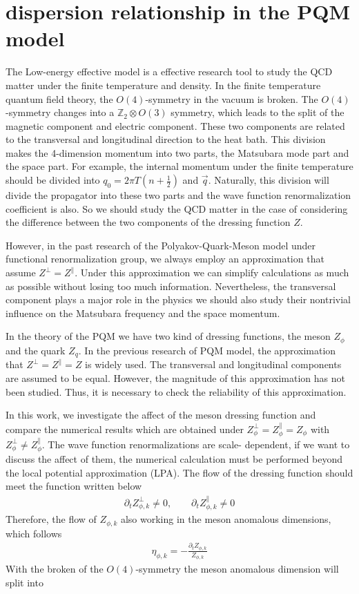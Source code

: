 \documentclass[%
reprint,
superscriptaddress,
showpacs,preprintnumbers,
 amsmath,amssymb,
 aps,
prd,
]{revtex4-1}
\begin{document}
\section{dispersion relationship in the PQM model}
The Low-energy effective model is a effective research tool to study the QCD matter under the finite temperature and density. In the 
finite temperature quantum field theory, the $O(4)$-symmetry in the vacuum is broken. The $O(4)$-symmetry changes into a 
$\mathbb{Z}_2\otimes O(3)$ symmetry, which leads to the split of the magnetic component and electric component. These two 
components are related to the transversal and longitudinal direction to the heat bath. This division makes the 4-dimension momentum
into two parts, the Matsubara mode part and the space part. For example, the internal momentum under the finite temperature should 
be divided into $q_0=2\pi T(n+\frac{1}{2})$ and $\vec{q}$. Naturally, this division will divide the propagator into these two parts and 
the wave function renormalization coefficient is also. So we should study the QCD matter in the case of considering the difference 
between the two components of the dressing function $Z$. \par

However, in the past research of the Polyakov-Quark-Meson model under functional renormalization group, we always employ an 
approximation that assume $Z^{\bot}=Z^{\|}$. Under this approximation we can simplify calculations as much as possible without 
losing too much information. Nevertheless, the transversal component plays a major role in the physics we should also study their 
nontrivial influence on the Matsubara frequency and the space momentum.\par

In the theory of the PQM we have two kind of dressing functions, the meson $Z_{\phi}$ and the quark $Z_{q}$. In the previous 
research of PQM model, the approximation that $Z^{\bot}=Z^{\|}=Z$ is widely used. The transversal and longitudinal components are
assumed to be equal. However, the magnitude of this approximation has not been studied. Thus, it is necessary to check the 
reliability of this approximation.\par

In this work, we investigate the affect of the meson dressing function and compare the numerical results which are obtained under 
$Z^{\bot}_{\phi}=Z^{\|}_{\phi}=Z_{\phi}$ with $Z^{\bot}_{\phi}\neq Z^{\|}_{\phi}$. The wave function renormalizations are scale-
dependent, if we want to discuss the affect of them, the numerical calculation must be performed beyond the local potential 
approximation (LPA). The flow of the dressing function should meet the function written below
\begin{align}
\partial_tZ^{\bot}_{\phi,k}\neq 0,\qquad \partial_tZ^{\|}_{\phi,k}\neq 0
\end{align}
Therefore, the flow of $Z_{\phi,k}$ also working in the meson anomalous dimensions, which follows
\begin{align}
\eta_{\phi,k}=-\frac{\partial_tZ_{\phi,k}}{Z_{\phi,k}}\label{eq:anodim1}
\end{align}
With the broken of the $O(4)$-symmetry the meson anomalous dimension will split into
\end{document}

